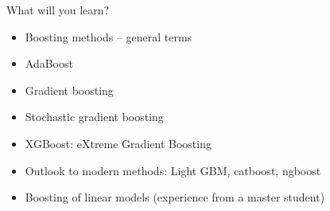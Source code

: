 \documentclass[
  10pt,
  ignorenonframetext,
]{beamer}
\providecommand{\tightlist}{%
  \setlength{\itemsep}{0pt}\setlength{\parskip}{0pt}}
\begin{document}
\begin{frame}
\begin{block}{What will you learn?}
\label{what-will-you-learn}
\(~\)

\begin{itemize}
\tightlist
\item
  Boosting methods -- general terms
\end{itemize}

\vspace{2mm}

\begin{itemize}
\tightlist
\item
  AdaBoost
\end{itemize}

\vspace{2mm}

\begin{itemize}
\tightlist
\item
  Gradient boosting
\end{itemize}

\vspace{2mm}

\begin{itemize}
\tightlist
\item
  Stochastic gradient boosting
\end{itemize}

\vspace{2mm}

\begin{itemize}
\tightlist
\item
  XGBoost: eXtreme Gradient Boosting
\end{itemize}

\vspace{2mm}

\begin{itemize}
\tightlist
\item
  Outlook to modern methods: Light GBM, catboost, ngboost
\end{itemize}

\vspace{2mm}

\begin{itemize}
\tightlist
\item
  Boosting of linear models (experience from a master student)
\end{itemize}
\end{block}
\end{frame}
\end{document}
